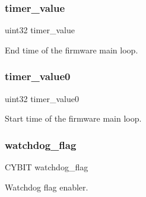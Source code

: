 \subsubsection{timer\+\_\+value}
{\footnotesize\ttfamily uint32 timer\+\_\+value}

End time of the firmware main loop. \mbox{\label{globals_8h_a9bab7f1b1cf2ba38d5968eee42644c32}} 
\subsubsection{timer\+\_\+value0}
{\footnotesize\ttfamily uint32 timer\+\_\+value0}

Start time of the firmware main loop. \mbox{\label{globals_8h_a156a860c465529ff2f515725ab816a58}} 
\subsubsection{watchdog\+\_\+flag}
{\footnotesize\ttfamily C\+Y\+B\+IT watchdog\+\_\+flag}

Watchdog flag enabler. 